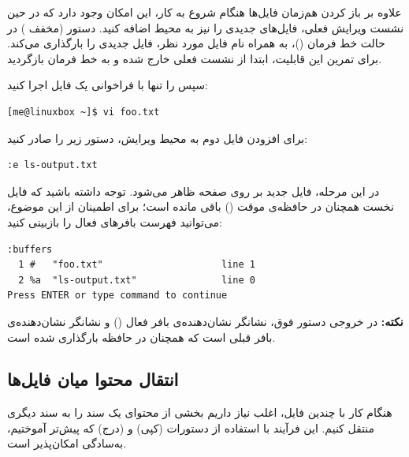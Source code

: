 علاوه بر باز کردن هم‌زمان فایل‌ها هنگام شروع به کار، این امکان وجود دارد که در حین نشست ویرایش فعلی، فایل‌های جدیدی را نیز به محیط اضافه کنید. دستور  (مخفف ) در حالت خط فرمان ()، به همراه نام فایل مورد نظر، فایل جدیدی را بارگذاری می‌کند. برای تمرین این قابلیت، ابتدا از نشست فعلی خارج شده و به خط فرمان بازگردید.

سپس  را تنها با فراخوانی یک فایل اجرا کنید:

\begin{latin}
\begin{lstlisting}
[me@linuxbox ~]$ vi foo.txt
\end{lstlisting}
\end{latin}

برای افزودن فایل دوم به محیط ویرایش، دستور زیر را صادر کنید:

\begin{latin}
\begin{lstlisting}
:e ls-output.txt
\end{lstlisting}
\end{latin}

در این مرحله، فایل جدید بر روی صفحه ظاهر می‌شود. توجه داشته باشید که فایل نخست همچنان در حافظه‌ی موقت () باقی مانده است؛ برای اطمینان از این موضوع، می‌توانید فهرست بافرهای فعال را بازبینی کنید:

\begin{latin}
\begin{lstlisting}
:buffers
  1 #   "foo.txt"                     line 1
  2 %a  "ls-output.txt"               line 0
Press ENTER or type command to continue
\end{lstlisting}
\end{latin}

\begin{note}
\textbf{نکته:} در خروجی دستور فوق، نشانگر  نشان‌دهنده‌ی بافر فعال () و نشانگر \cmd{\#} نشان‌دهنده‌ی بافر قبلی است که همچنان در حافظه بارگذاری شده است.
\end{note}

\subsection{انتقال محتوا میان فایل‌ها}

هنگام کار با چندین فایل، اغلب نیاز داریم بخشی از محتوای یک سند را به سند دیگری منتقل کنیم. این فرآیند با استفاده از دستورات  (کپی) و  (درج) که پیش‌تر آموختیم، به‌سادگی امکان‌پذیر است.

